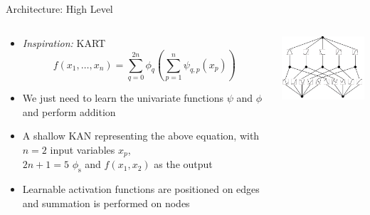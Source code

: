 \begin{frame}{Architecture: High Level}
  \begin{columns}
      \begin{column}{8.5cm}
      \begin{itemize}
        \item \textit{Inspiration:} KART
        $$f(x_1,\dots,x_n) = \sum_{q=0}^{2n}\phi_q\left(\sum_{p=1}^n\psi_{q,p}(x_p)\right)$$
        \item We just need to learn the univariate functions $\psi$ and $\phi$ and perform addition
        \vspace{0.5em}
        \item \strong{($\rightarrow$)} A shallow KAN representing the above equation, with $n=2$ input variables $x_p$,\\ $2n+1=5$ $\phi_{\text{s}}$ and  $f(x_1,x_2)$ as the output
        \vspace{0.5em}
        \item Learnable activation functions are positioned on edges and summation is performed on nodes
      \end{itemize}
    \end{column}

    \begin{column}{5cm}
      \includegraphics[width=5cm]{contents/images/KAN_arch_simple}
    \end{column}
  \end{columns}
\end{frame}

